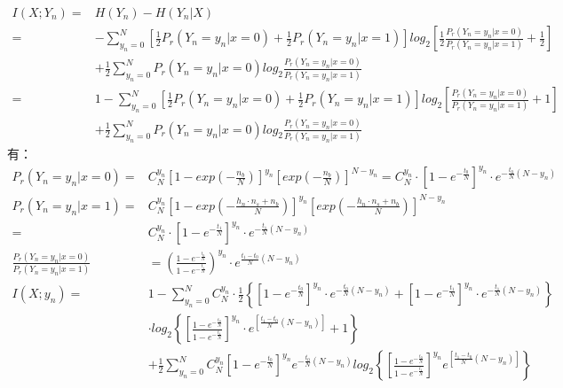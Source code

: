 \documentclass[12pt]{article}
\begin{document}
\begin{equation*}
    \begin{aligned}
       I(X;Y_n)=&H(Y_n)-H(Y_n|X) \\
       =&-\sum\limits_{y_n=0}^N\left[\frac{1}{2}P_r(Y_n=y_n|x=0)+\frac{1}{2}P_r(Y_n=y_n|x=1)\right]log_2\left[\frac{1}{2}\frac{P_r(Y_n=y_n|x=0)}{P_r(Y_n=y_n|x=1)}+\frac{1}{2}\right] \\
       &+\frac{1}{2}\sum\limits_{y_n=0}^NP_r(Y_n=y_n|x=0)log_2\frac{P_r(Y_n=y_n|x=0)}{P_r(Y_n=y_n|x=1)} \\
       =&1-\sum\limits_{y_n=0}^N\left[\frac{1}{2}P_r(Y_n=y_n|x=0)+\frac{1}{2}P_r(Y_n=y_n|x=1)\right]log_2\left[\frac{P_r(Y_n=y_n|x=0)}{P_r(Y_n=y_n|x=1)}+1\right] \\
       &+ \frac{1}{2}\sum\limits_{y_n=0}^NP_r(Y_n=y_n|x=0)log_2\frac{P_r(Y_n=y_n|x=0)}{P_r(Y_n=y_n|x=1)}
    \end{aligned}
\end{equation*}
有：
\begin{equation*}
    \begin{aligned}
       P_r(Y_n=y_n|x=0)=&C_N^{y_n}\left[1-exp\left(-\frac{n_b}{N}\right)\right]^{y_n}\left[exp\left(-\frac{n_b}{N}\right)\right]^{N-y_n}=C_N^{y_n}·\left[1-e^{-\frac{t_0}{N}}\right]^{y_n}·e^{-\frac{t_0}{N}(N-y_n)} \\
       P_r(Y_n=y_n|x=1)=&C_N^{y_n}\left[1-exp\left(-\frac{h_n·n_s+n_b}{N}\right)\right]^{y_n}\left[exp\left(-\frac{h_n·n_s+n_b}{N}\right)\right]^{N-y_n} \\
       =&C_N^{y_n}·\left[1-e^{-\frac{t_1}{N}}\right]^{y_n}·e^{-\frac{t_1}{N}(N-y_n)} \\
       \frac{P_r(Y_n=y_n|x=0)}{P_r(Y_n=y_n|x=1)}&=\left(\frac{1-e^{-\frac{t_0}{N}}}{1-e^{-\frac{t_1}{N}}}\right)^{y_n}·e^{\frac{t_1-t_0}{N}(N-y_n)} \\
       I(X;y_n)=&1-\sum\limits_{y_n=0}^NC_N^{y_n}·\frac{1}{2}\left\{\left[1-e^{-\frac{t_0}{N}}\right]^{y_n}·e^{-\frac{t_0}{N}(N-y_n)}+\left[1-e^{-\frac{t_1}{N}}\right]^{y_n}·e^{-\frac{t_1}{N}(N-y_n)}\right\} \\
       &·log_2\left\{\left[\frac{1-e^{-\frac{t_0}{N}}}{1-e^{-\frac{t_1}{N}}}\right]^{y_n}·e^{[\frac{t_1-t_0}{N}(N-y_n)]}+1\right\} \\
       &+\frac{1}{2}\sum\limits_{y_n=0}^NC_N^{y_n}\left[1-e^{-\frac{t_0}{N}}\right]^{y_n}e^{-\frac{t_0}{N}(N-y_n)}log_2\left\{\left[\frac{1-e^{-\frac{t_0}{N}}}{1-e^{-\frac{t_1}{N}}}\right]^{y_n}e^{[\frac{t_1-t_0}{N}(N-y_n)]}\right\}
    \end{aligned}
\end{equation*}
\end{document}
